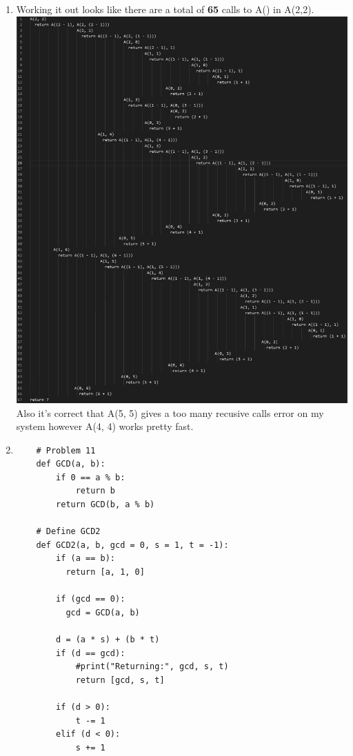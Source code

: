 \documentclass{article}
\begin{document}
\begin{enumerate}
  \item 
    Working it out looks like there are a total of \textbf{65} calls to A() in A(2,2).
    \linebreak
    \includegraphics[width=\linewidth]{7.png}
    \linebreak
    Also it's correct that A(5, 5) gives a too many recusive calls error on my system however A(4, 4) works pretty fast.

    \item 
  \begin{lstlisting}
    # Problem 11
    def GCD(a, b):
        if 0 == a % b:
            return b
        return GCD(b, a % b)
    
    # Define GCD2    
    def GCD2(a, b, gcd = 0, s = 1, t = -1):
        if (a == b):
          return [a, 1, 0]            
        
        if (gcd == 0):
          gcd = GCD(a, b)
        
        d = (a * s) + (b * t)
        if (d == gcd):
            #print("Returning:", gcd, s, t)
            return [gcd, s, t]
        
        if (d > 0):
            t -= 1
        elif (d < 0):
            s += 1 
        

\end{lstlisting}
\end{enumerate}
\end{document}
